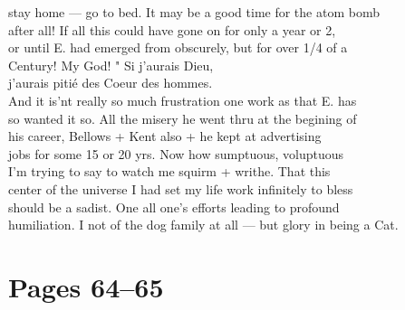\documentclass[11pt,a4paper]{article}
\begin{document}
{stay home --- go to bed. \qquad It may be a good time for the atom bomb \\
after all! If all this could have gone on for only a year or 2, \\
or until E. had emerged from obscurely, but for over 1/4 of a \\
Century! My God! " Si j'aurais Dieu, \\
\qquad \qquad j'aurais pitié des Coeur des hommes. \\
And it is'nt really so much frustration one work as that E. has \\
so wanted it so. All the misery he went thru at the begining of \\
his career,  Bellows + Kent also  + he kept at advertising \\
jobs for some 15 or 20 yrs. Now how sumptuous, voluptuous \\
I'm trying to say to watch me squirm + writhe. That this \\
center of the universe I had set my life work infinitely to bless \\
should be a sadist. One  all one's efforts leading to profound \\
humiliation. I not of the dog family at all --- but glory in being a Cat.}






\section{Pages 64--65}
\end{document}
